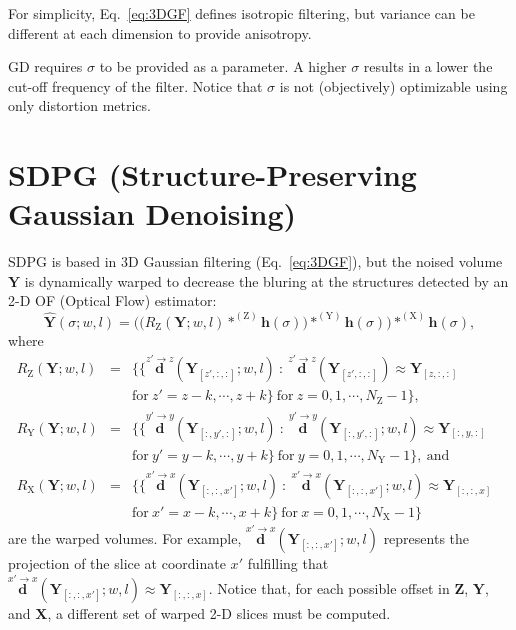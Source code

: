 \documentclass{article}
\begin{document}
For simplicity, Eq.~\ref{eq:3DGF} defines isotropic
filtering, but variance can be different at each dimension to
provide anisotropy.

GD requires $\sigma$ to be provided as a parameter. A higher $\sigma$
results in a lower the cut-off frequency of the filter. Notice that
$\sigma$ is not (objectively) optimizable using only distortion 
metrics.

\section{SDPG (Structure-Preserving Gaussian Denoising) \cite{gonzalez2023structure}}

SDPG is based in 3D Gaussian filtering (Eq.~\ref{eq:3DGF}), but the noised
volume ${\mathbf Y}$ is dynamically warped to decrease the bluring at the
structures detected by an 2-D OF (Optical Flow) estimator:
\begin{equation}
  \hat{\mathbf{Y}}(\sigma; w, l) = \Big(\big(R_\text{Z}(\mathbf{Y}; w, l)*^{(\text{Z})}{\mathbf h}(\sigma)\big)*^{(\text{Y})}{\mathbf h}(\sigma)\Big)*^{(\text{X})}{\mathbf h}(\sigma),
    \label{eq:SDPG}
\end{equation}
where
\begin{equation*}
    \begin{array}{rclll}
    R_\text{Z}(\mathbf{Y}; w, l) & = & \big\{ \{ \overset{z'\rightarrow z}{\mathbf d}({\mathbf Y}_{[z',:,:]}; w, l)~:~\overset{z'\rightarrow z}{\mathbf d}({\mathbf Y}_{[z',:,:]})\approx{\mathbf Y}_{[z,:,:]} & \\ & & \text{for}
 ~z'=z-k,\cdots,z+k\} ~\text{for}~z=0,1,\cdots,N_\text{Z}-1\big\}, \\
    R_\text{Y}(\mathbf{Y}; w, l) & = & \big\{ \{ \overset{y'\rightarrow y}{\mathbf d}({\mathbf Y}_{[:,y',:]}; w, l)~:~\overset{y'\rightarrow y}{\mathbf d}({\mathbf Y}_{[:,y',:]}; w, l)\approx{\mathbf Y}_{[:,y,:]} & \\ & & \text{for}
 ~y'=y-k,\cdots,y+k\} ~\text{for}~y=0,1,\cdots,N_\text{Y}-1\big\},~\text{and} \\
    R_\text{X}(\mathbf{Y}; w, l) & = & \big\{ \{ \overset{x'\rightarrow x}{\mathbf d}({\mathbf Y}_{[:,:,x']}; w, l)~:~\overset{x'\rightarrow x}{\mathbf d}({\mathbf Y}_{[:,:,x']}; w, l)\approx{\mathbf Y}_{[:,:,x]} & \\ & & \text{for}
 ~x'=x-k,\cdots,x+k\} ~\text{for}~x=0,1,\cdots,N_\text{X}-1\big\}
    \end{array}
\end{equation*}
are the warped volumes. For example,
$\overset{x'\rightarrow x}{\mathbf d}({\mathbf Y}_{[:,:,x']}; w, l)$
represents the projection of the slice at coordinate $x'$ fulfilling
that
$\overset{x'\rightarrow x}{\mathbf d}({\mathbf Y}_{[:,:,x']}; w,
l)\approx{\mathbf Y}_{[:,:,x]}$. Notice that, for each possible offset
in ${\mathbf Z}$, ${\mathbf Y}$, and ${\mathbf X}$, a different set of
warped 2-D slices must be computed.
\end{document}

